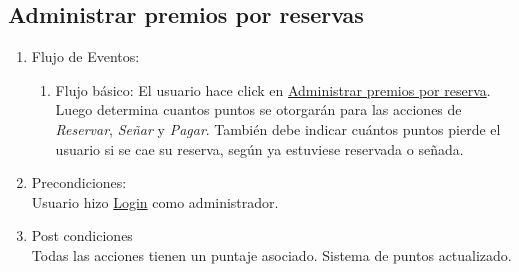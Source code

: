 \documentclass[a4paper,11pt]{article}
\begin{document}

\subsection{Administrar premios por reservas}
\begin{enumerate}


    \begin{enumerate}
    \item Descripción breve: \\
        Este caso de uso describe como se define la cantidad de puntos que gana
        un usuario al pasar por los distintos estados de una reserva, de acuerdo
        al sistema de puntos.
    \item Actores \\
        Administrador.
    \item Disparadores: \\
        El administrador hace click en \underline{Administrar premios por reserva}
        dentro de su panel de administración.
    \end{enumerate}

    \item Flujo de Eventos: 

    \begin{enumerate}

        \item Flujo básico:
            El usuario hace click en \underline{Administrar premios por reserva}.
            Luego determina cuantos puntos se otorgarán para las acciones de
            \textit{Reservar}, \textit{Señar} y \textit{Pagar}.
            También debe indicar cuántos puntos pierde el usuario si se cae
            su reserva, según ya estuviese reservada o señada.
    \end{enumerate}

    \item Precondiciones: \\
        Usuario hizo \underline{Login} como administrador.

    \item Post condiciones \\
        Todas las acciones tienen un puntaje asociado. Sistema de puntos
        actualizado.

\end{enumerate}
\end{document}
